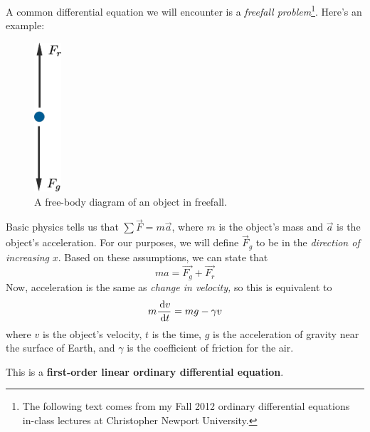 A common differential equation we will encounter is a \emph{freefall problem}\footnote{The following text comes from my Fall 2012 ordinary differential equations in-class lectures at Christopher Newport University.}.
Here's an example:

\begin{figure}[H]
  \begin{center}
    \includegraphics[width=1cm]{continuous/ode/freefall.eps}
  \end{center}
  \caption{A free-body diagram of an object in freefall.}
  \label{fig:freefall}
\end{figure}

Basic physics tells us that $\sum \vec F = m\vec a$,
where $m$ is the object's mass and $\vec{a}$ is the object's acceleration.
For our purposes, we will define $\vec F_g$ to be in the \emph{direction of increasing} $x$.
Based on these assumptions, we can state that
\[
  ma=\vec{F_g}+\vec{F_r}
  \]
Now, acceleration is the same as \emph{change in velocity,} so this is equivalent to
\[
  m\frac{\,\mathrm{d} v}{\,\mathrm{d} t}=mg - \gamma v
  \]
where $v$ is the object's velocity, $t$ is the time, $g$ is the acceleration of gravity near the surface of Earth, and $\gamma$ is the coefficient of friction for the air.

This is a \textbf{first-order linear ordinary differential equation}.

